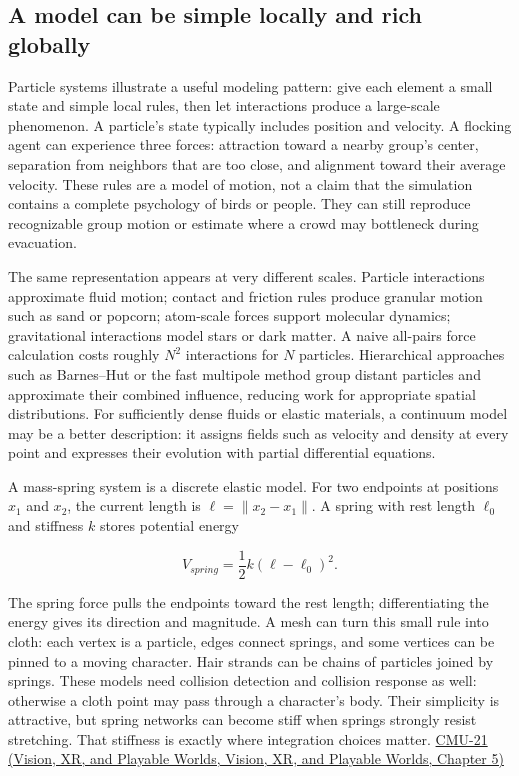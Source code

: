 \subsection{A model can be simple locally and rich globally}\label{04-visual-computing-ii-ch029-a-model-can-be-simple-locally-and-rich-globally}

Particle systems illustrate a useful modeling pattern: give each element a small state and simple local rules, then let interactions produce a large-scale phenomenon. A particle's state typically includes position and velocity. A flocking agent can experience three forces: attraction toward a nearby group's center, separation from neighbors that are too close, and alignment toward their average velocity. These rules are a model of motion, not a claim that the simulation contains a complete psychology of birds or people. They can still reproduce recognizable group motion or estimate where a crowd may bottleneck during evacuation.

The same representation appears at very different scales. Particle interactions approximate fluid motion; contact and friction rules produce granular motion such as sand or popcorn; atom-scale forces support molecular dynamics; gravitational interactions model stars or dark matter. A naive all-pairs force calculation costs roughly \(N^2\) interactions for \(N\) particles. Hierarchical approaches such as Barnes--Hut or the fast multipole method group distant particles and approximate their combined influence, reducing work for appropriate spatial distributions. For sufficiently dense fluids or elastic materials, a continuum model may be a better description: it assigns fields such as velocity and density at every point and expresses their evolution with partial differential equations.

A mass-spring system is a discrete elastic model. For two endpoints at positions \(x_1\) and \(x_2\), the current length is \(\ell=\|x_2-x_1\|\). A spring with rest length \(\ell_0\) and stiffness \(k\) stores potential energy

\[
V_{spring}=\frac12 k(\ell-\ell_0)^2.
\]

The spring force pulls the endpoints toward the rest length; differentiating the energy gives its direction and magnitude. A mesh can turn this small rule into cloth: each vertex is a particle, edges connect springs, and some vertices can be pinned to a moving character. Hair strands can be chains of particles joined by springs. These models need collision detection and collision response as well: otherwise a cloth point may pass through a character's body. Their simplicity is attractive, but spring networks can become stiff when springs strongly resist stretching. That stiffness is exactly where integration choices matter. \href{../07-Vision-XR-and-Playable-Worlds/main.pdf\#nameddest=04-visual-computing-ii-ch036-cmu-21---dynamics-and-time-integration}{CMU-21 (Vision, XR, and Playable Worlds, Vision, XR, and Playable Worlds, Chapter 5)}

